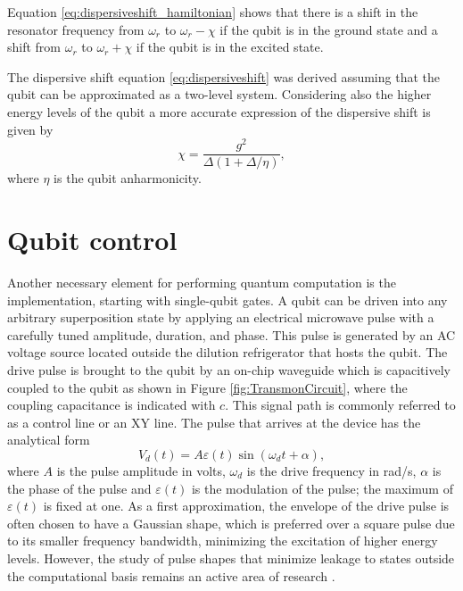 Equation \ref{eq:dispersiveshift_hamiltonian} shows that there is a shift in the resonator frequency from $\omega_r$ to $\omega_r - \chi$ if the qubit is in the ground state and a shift from $\omega_r$ to $\omega_r + \chi$ if the qubit is in the excited state.

The dispersive shift equation \ref{eq:dispersiveshift} was derived assuming that the qubit can be approximated as a two-level system.
Considering also the higher energy levels of the qubit a more accurate expression of the dispersive shift is given by 
\begin{equation}
    \chi = \frac{g^2}{\Delta(1+\Delta/\eta)},
\end{equation} 
where $\eta$ is the qubit anharmonicity.

\section{Qubit control}\label{sec:qubit_control}
Another necessary element for performing quantum computation is the implementation, starting with single-qubit gates. 
A qubit can be driven into any arbitrary superposition state by applying an electrical microwave pulse with a carefully tuned amplitude, duration, and phase.
This pulse is generated by an AC voltage source located outside the dilution refrigerator that hosts the qubit.
The drive pulse is brought to the qubit by an on-chip waveguide which is capacitively coupled to the qubit as shown in Figure \ref{fig:TransmonCircuit}, where the coupling capacitance is indicated with $c$.
This signal path is commonly referred to as a control line or an XY line. The pulse that arrives at the device has the analytical form
\begin{equation}\label{eq:drive_pulse}
    V_d(t) = A\varepsilon(t)\sin{(\omega_d t + \alpha)},
\end{equation}
where $A$ is the pulse amplitude in volts, $\omega_d$ is the drive frequency in rad/s, $\alpha$ is the phase of the pulse and $\varepsilon(t)$ is the modulation of the pulse; the maximum of $\varepsilon(t)$ is fixed at one.
As a first approximation, the envelope of the drive pulse is often chosen to have a Gaussian shape, which is preferred over a square pulse due to its smaller frequency bandwidth, minimizing the excitation of higher energy levels.
However, the study of pulse shapes that minimize leakage to states outside the computational basis remains an active area of research \cite{chiaro2025activeleakagecancellationsingle}.

